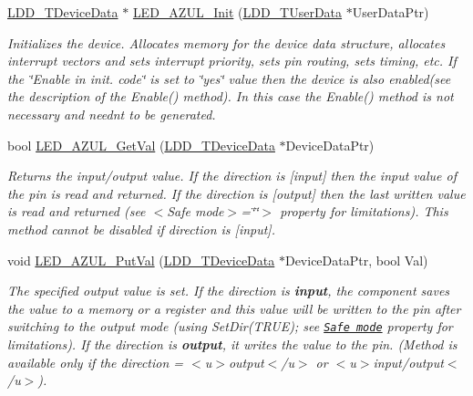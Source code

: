 \begin{DoxyCompactItemize}
\item 
\hyperlink{group___p_e___types__module_gac5cf1362f1f0e3a2ce71b1bf2276d091}{L\+D\+D\+\_\+\+T\+Device\+Data} $\ast$ \hyperlink{group___l_e_d___a_z_u_l__module_ga722b94535fb629c7ee54c9008bd5ff44}{L\+E\+D\+\_\+\+A\+Z\+U\+L\+\_\+\+Init} (\hyperlink{group___p_e___types__module_ga0b66a73f87238a782318aa0be7578e35}{L\+D\+D\+\_\+\+T\+User\+Data} $\ast$User\+Data\+Ptr)
\begin{DoxyCompactList}\small\item\em Initializes the device. Allocates memory for the device data structure, allocates interrupt vectors and sets interrupt priority, sets pin routing, sets timing, etc. If the \char`\"{}\+Enable
    in init. code\char`\"{} is set to \char`\"{}yes\char`\"{} value then the device is also enabled(see the description of the Enable() method). In this case the Enable() method is not necessary and needn\textquotesingle{}t to be generated. \end{DoxyCompactList}\item 
bool \hyperlink{group___l_e_d___a_z_u_l__module_gacfb153ddc716a434fc5eabbf41a2f133}{L\+E\+D\+\_\+\+A\+Z\+U\+L\+\_\+\+Get\+Val} (\hyperlink{group___p_e___types__module_gac5cf1362f1f0e3a2ce71b1bf2276d091}{L\+D\+D\+\_\+\+T\+Device\+Data} $\ast$Device\+Data\+Ptr)
\begin{DoxyCompactList}\small\item\em Returns the input/output value. If the direction is \mbox{[}input\mbox{]} then the input value of the pin is read and returned. If the direction is \mbox{[}output\mbox{]} then the last written value is read and returned (see $<$\+Safe mode$>$=\char`\"{}\char`\"{}$>$ property for limitations). This method cannot be disabled if direction is \mbox{[}input\mbox{]}. \end{DoxyCompactList}\item 
void \hyperlink{group___l_e_d___a_z_u_l__module_gaff08319e4556cd54fc899af6e8f2658a}{L\+E\+D\+\_\+\+A\+Z\+U\+L\+\_\+\+Put\+Val} (\hyperlink{group___p_e___types__module_gac5cf1362f1f0e3a2ce71b1bf2276d091}{L\+D\+D\+\_\+\+T\+Device\+Data} $\ast$Device\+Data\+Ptr, bool Val)
\begin{DoxyCompactList}\small\item\em The specified output value is set. If the direction is {\bfseries  input}, the component saves the value to a memory or a register and this value will be written to the pin after switching to the output mode (using {\ttfamily Set\+Dir(\+T\+R\+U\+E)}; see \href{BitIOProperties.html#SafeMode}{\tt Safe mode} property for limitations). If the direction is {\bfseries output}, it writes the value to the pin. (Method is available only if the direction = $<$u$>${\ttfamily output}$<$/u$>$ or $<$u$>${\ttfamily  input/output}$<$/u$>$). \end{DoxyCompactList}\item 

\end{DoxyCompactItemize}
